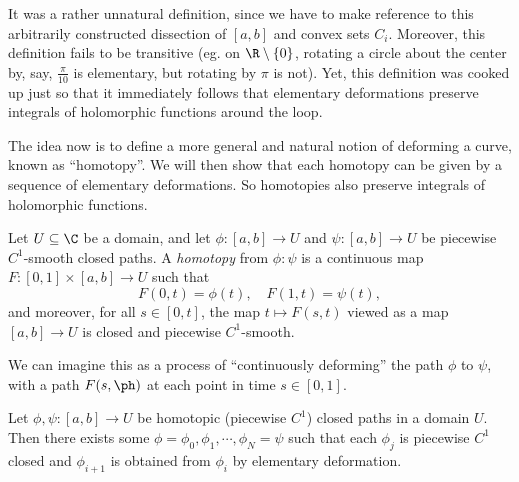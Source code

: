 \documentclass[a4paper]{article}
\begin{document}
It was a rather unnatural definition, since we have to make reference to this arbitrarily constructed dissection of $[a, b]$ and convex sets $C_i$. Moreover, this definition fails to be transitive (eg. on $\R \setminus \{0\}$, rotating a circle about the center by, say, $\frac{\pi}{10}$ is elementary, but rotating by $\pi$ is not). Yet, this definition was cooked up just so that it immediately follows that elementary deformations preserve integrals of holomorphic functions around the loop.

The idea now is to define a more general and natural notion of deforming a curve, known as ``homotopy''. We will then show that each homotopy can be given by a sequence of elementary deformations. So homotopies also preserve integrals of holomorphic functions.

\begin{defi}
  Let $U \subseteq \C$ be a domain, and let $\phi: [a, b] \to U$ and $\psi: [a, b] \to U$ be piecewise $C^1$-smooth closed paths. A \emph{homotopy} from $\phi: \psi$ is a continuous map $F: [0, 1] \times [a, b] \to U$ such that
  \[
    F(0, t) = \phi(t),\quad F(1, t) = \psi(t),
  \]
  and moreover, for all $s \in [0, t]$, the map $t \mapsto F(s, t)$ viewed as a map $[a, b] \to U$ is closed and piecewise $C^1$-smooth.
\end{defi}
We can imagine this as a process of ``continuously deforming'' the path $\phi$ to $\psi$, with a path $F(s, \ph)$ at each point in time $s \in [0, 1]$.

\begin{prop}
  Let $\phi, \psi: [a, b] \to U$ be homotopic (piecewise $C^1$) closed paths in a domain $U$. Then there exists some $\phi = \phi_0, \phi_1, \cdots, \phi_N = \psi$ such that each $\phi_j$ is piecewise $C^1$ closed and $\phi_{i + 1}$ is obtained from $\phi_i$ by elementary deformation.
\end{prop}
\end{document}
